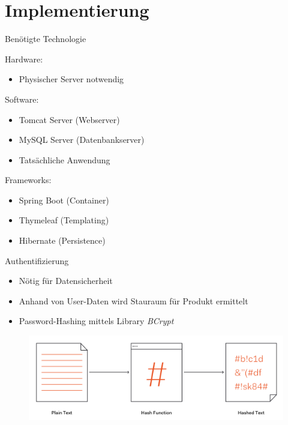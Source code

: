 \section{Implementierung}

\begin{frame}{Benötigte Technologie}

Hardware:
\begin{itemize}
\item Physischer Server notwendig
\end{itemize}

Software:
\begin{itemize}
\item Tomcat Server (Webserver)
\item MySQL Server (Datenbankserver)
\item Tatsächliche Anwendung
\end{itemize}

Frameworks:
\begin{itemize}
\item Spring Boot (Container)\\
\item Thymeleaf (Templating)
\item Hibernate (Persistence)
\end{itemize}

\end{frame}


\begin{frame}{Authentifizierung}

\begin{itemize}
\item Nötig für Datensicherheit
\item Anhand von User-Daten wird Stauraum für Produkt ermittelt
\item Password-Hashing mittels Library \emph{BCrypt}
\end{itemize}

\vspace{.5cm}

\begin{figure}
\includegraphics[width=.9\linewidth]{./_img/hashing_01}
\end{figure}

\end{frame}


